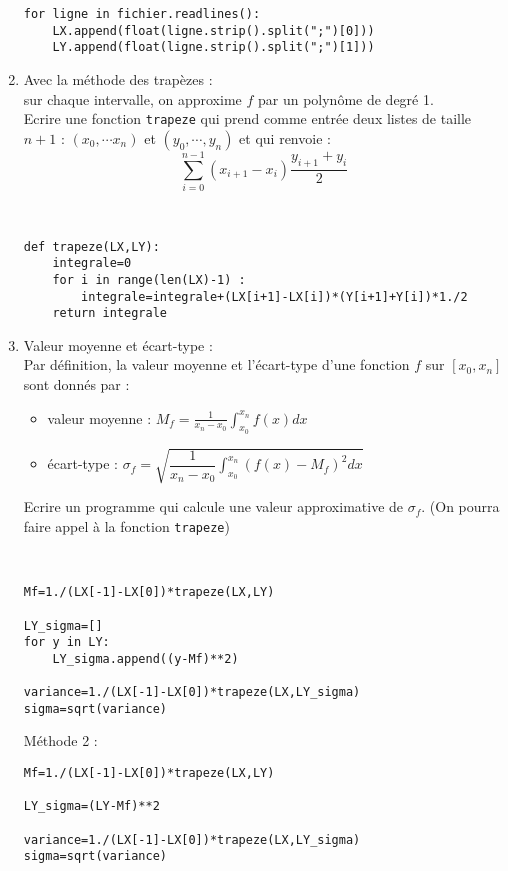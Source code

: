 \begin{enumerate}
\begin{solution}
\begin{verbatim}
for ligne in fichier.readlines():
    LX.append(float(ligne.strip().split(";")[0]))
    LY.append(float(ligne.strip().split(";")[1]))
\end{verbatim}
\end{solution}
\item Avec la méthode des trapèzes : \\
sur chaque intervalle, on approxime $f$ par un polynôme de degré 1.\\
Ecrire une fonction \verb?trapeze? qui prend comme entrée deux listes de taille $n+1$ : $(x_0,\cdots x_n)$ et $(y_0,\cdots,y_{n})$ et qui renvoie :
\[\displaystyle \sum_{i=0}^{n-1} (x_{i+1}-x_i)\dfrac{y_{i+1}+y_i}{2}\]
\begin{solution}~\\
\vspace{-1cm}
\begin{verbatim}
def trapeze(LX,LY):
    integrale=0
    for i in range(len(LX)-1) :
        integrale=integrale+(LX[i+1]-LX[i])*(Y[i+1]+Y[i])*1./2
    return integrale
\end{verbatim}
\end{solution}
\item Valeur moyenne et écart-type :\\
Par définition, la valeur moyenne et l'écart-type d'une fonction $f$ sur $[x_0,x_n]$ sont donnés par :
\begin{itemize}
\item valeur moyenne : $M_f=\displaystyle{ \frac{1}{x_n-x_0} \int_{x_0}^{x_n} f(x)dx}$\medskip 
\item écart-type : $\displaystyle{\sigma_f=\sqrt{\dfrac{1}{x_n-x_0}\int_{x_0}^{x_n}(f(x)-M_f)^2dx}}$
\end{itemize}
Ecrire un programme qui calcule une valeur approximative de $\sigma_f$. (On pourra faire appel à la fonction \verb?trapeze?)
\begin{solution}~\\
\vspace{-1cm}
\begin{verbatim}
Mf=1./(LX[-1]-LX[0])*trapeze(LX,LY)

LY_sigma=[]
for y in LY:
	LY_sigma.append((y-Mf)**2)

variance=1./(LX[-1]-LX[0])*trapeze(LX,LY_sigma)		
sigma=sqrt(variance)	
\end{verbatim}

Méthode 2 : 
\begin{verbatim}
Mf=1./(LX[-1]-LX[0])*trapeze(LX,LY)

LY_sigma=(LY-Mf)**2

variance=1./(LX[-1]-LX[0])*trapeze(LX,LY_sigma)		
sigma=sqrt(variance)
\end{verbatim}

\end{solution}
\end{enumerate}




